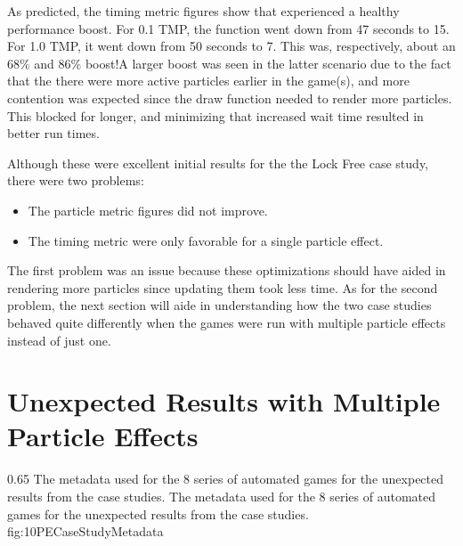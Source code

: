As predicted, the timing metric figures show that  experienced a healthy performance boost. For 0.1 TMP, the function went down from 47 seconds to 15. For 1.0 TMP, it went down from 50 seconds to 7. This was, respectively, about an 68\% and 86\% boost!\footnotemark A larger boost was seen in the latter scenario due to the fact that the there were more active particles earlier in the game(s), and more contention was expected since the draw function needed to render more particles. This blocked  for longer, and minimizing that increased wait time resulted in better run times. 


Although these were excellent initial results for the the Lock Free case study, there were two problems:

\begin{itemize}[nolistsep,topsep=0pt]
	\item The particle metric figures did not improve. 
	\item The timing metric were only favorable for a single particle effect.
\end{itemize}

The first problem was an issue because these optimizations should have aided in rendering more particles since updating them took less time. As for the second problem, the next section will aide in understanding how the two case studies behaved quite differently when the games were run with multiple particle effects instead of just one.

\newpage
\section{Unexpected Results with Multiple Particle Effects}\label{sec:studies_unexpected_results}

{0.65}
{The metadata used for the 8 series of automated games for the unexpected results from the case studies.}
{The metadata used for the 8 series of automated games for the unexpected results from the case studies.}
{fig:10PECaseStudyMetadata}

